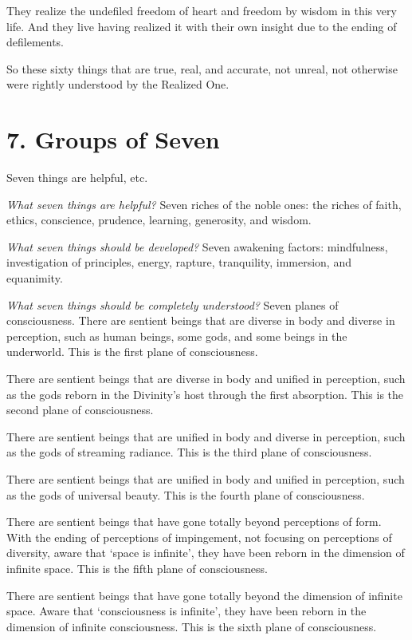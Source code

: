 \documentclass[12pt,openany]{book}%
\begin{document}
They realize the undefiled freedom of heart and freedom by wisdom in this very life. And they live having realized it with their own insight due to the ending of defilements. 

So these sixty things that are true, real, and accurate, not unreal, not otherwise were rightly understood by the Realized One. 

\section*{7. Groups of Seven }

Seven things are helpful, etc. 

\emph{What seven things are helpful?} Seven riches of the noble ones: the riches of faith, ethics, conscience, prudence, learning, generosity, and wisdom. 

\emph{What seven things should be developed?} Seven awakening factors: mindfulness, investigation of principles, energy, rapture, tranquility, immersion, and equanimity. 

\emph{What seven things should be completely understood?} Seven planes of consciousness. There are sentient beings that are diverse in body and diverse in perception, such as human beings, some gods, and some beings in the underworld. This is the first plane of consciousness. 

There are sentient beings that are diverse in body and unified in perception, such as the gods reborn in the Divinity’s host through the first absorption. This is the second plane of consciousness. 

There are sentient beings that are unified in body and diverse in perception, such as the gods of streaming radiance. This is the third plane of consciousness. 

There are sentient beings that are unified in body and unified in perception, such as the gods of universal beauty. This is the fourth plane of consciousness. 

There are sentient beings that have gone totally beyond perceptions of form. With the ending of perceptions of impingement, not focusing on perceptions of diversity, aware that ‘space is infinite’, they have been reborn in the dimension of infinite space. This is the fifth plane of consciousness. 

There are sentient beings that have gone totally beyond the dimension of infinite space. Aware that ‘consciousness is infinite’, they have been reborn in the dimension of infinite consciousness. This is the sixth plane of consciousness. 
\end{document}
